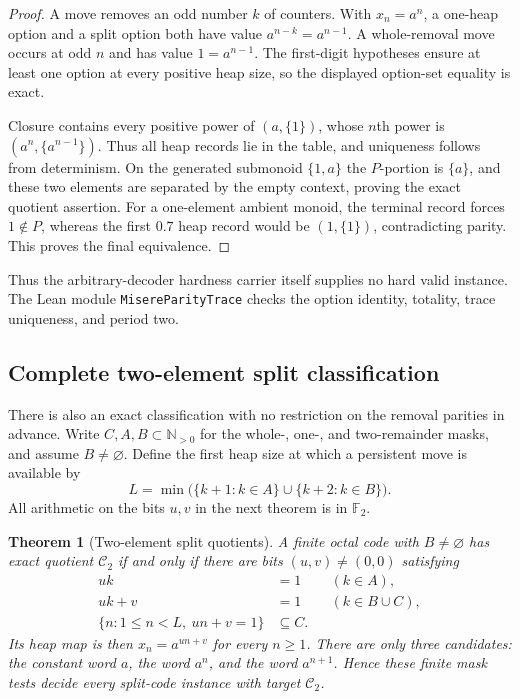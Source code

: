 \documentclass[11pt]{article}
\newtheorem{theorem}{Theorem}[section]
\theoremstyle{definition}
\theoremstyle{remark}
\newcommand{\N}{\mathbb N}
\newcommand{\F}{\mathbb F}
\begin{document}
\begin{proof}
A move removes an odd number $k$ of counters.  With $x_n=a^n$, a one-heap
option and a split option both have value $a^{n-k}=a^{n-1}$.
A whole-removal move occurs at odd $n$ and has value $1=a^{n-1}$.
The first-digit hypotheses ensure at least one option at every positive
heap size, so the displayed option-set equality is exact.

Closure contains every positive power of $(a,\{1\})$, whose $n$th power
is $(a^n,\{a^{n-1}\})$.  Thus all heap records lie in the table, and
uniqueness follows from determinism.  On the generated submonoid
$\{1,a\}$ the $P$-portion is $\{a\}$, and these two elements are separated
by the empty context, proving the exact quotient assertion.
For a one-element ambient monoid, the terminal record forces $1\notin P$,
whereas the first $0.7$ heap record would be $(1,\{1\})$, contradicting
parity.  This proves the final equivalence.
\end{proof}

Thus the arbitrary-decoder hardness carrier itself supplies no hard valid
instance.  The Lean module \texttt{MisereParityTrace} checks the option
identity, totality, trace uniqueness, and period two.

\subsection{Complete two-element split classification}\label{sec:binary-split}

There is also an exact classification with no restriction on the removal
parities in advance.  Write $C,A,B\subset\N_{>0}$ for the whole-, one-,
and two-remainder masks, and assume $B\ne\varnothing$.  Define the first
heap size at which a persistent move is available by
\[
 L=\min\bigl(\{k+1:k\in A\}\cup\{k+2:k\in B\}\bigr).
\]
All arithmetic on the bits $u,v$ in the next theorem is in $\F_2$.

\begin{theorem}[Two-element split quotients]\label{thm:binary-split}
A finite octal code with $B\ne\varnothing$ has exact quotient
$\mathcal C_2$ if and only if there are bits $(u,v)\ne(0,0)$ satisfying
\[
\begin{aligned}
 uk&=1 &&(k\in A),\\
 uk+v&=1 &&(k\in B\cup C),\\
 \{n:1\le n<L,\ un+v=1\}&\subseteq C.
\end{aligned}
\]
Its heap map is then $x_n=a^{un+v}$ for every $n\ge1$.
There are only three candidates: the constant word $a$, the word $a^n$,
and the word $a^{n+1}$.  Hence these finite mask tests decide every
split-code instance with target $\mathcal C_2$.
\end{theorem}
\end{document}
